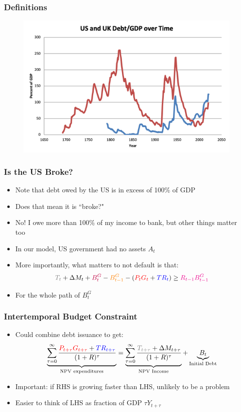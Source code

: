 \documentclass{beamer}
\begin{document}
\begin{frame}
\frametitle{Definitions}
\begin{figure}
\centering
\includegraphics[scale=0.6]{Debt2.png}
\end{figure}
\end{frame}

\begin{frame}
\frametitle{Is the US Broke?}
\begin{itemize}
\item Note that debt owed by the US is in excess of 100\% of GDP
\bigskip
\item Does that mean it is ``broke?"
\bigskip
\item<2-> No!  I owe more than 100\% of my income to bank, but other things matter too
\bigskip
\item<3-> In our model, US government had no assets $A_t$ 
\bigskip
\item<4-> More importantly, what matters to not default is that:
$$\textcolor{gray}{T_t}+\Delta M_t+\textcolor{purple}{B_t^G}-\textcolor{orange}{B_{t-1}^G}-(\textcolor{red}{P_tG_t}+\textcolor{blue}{TR_t})\geq\textcolor{magenta}{R_{t-1}B_{t-1}^G}$$
\item<5-> For the whole path of $B_t^G$
\end{itemize}
\end{frame}

\begin{frame}
\frametitle{Intertemporal Budget Constraint}
\begin{itemize}
\item Could combine debt issuance to get:
$$\underbrace{\sum_{\tau=0}^\infty\frac{\textcolor{red}{P_{t+\tau}G_{t+\tau}}+\textcolor{blue}{TR_{t+\tau}}}{(1+R)^\tau}}_{\text{NPV expenditures}}=\underbrace{\sum_{\tau=0}^\infty \frac{\textcolor{gray}{T_{t+\tau}}+\Delta M_{t+\tau}}{(1+R)^\tau}}_{\text{NPV Income}}+\underbrace{B_t}_{\text{Initial Debt}}$$
\bigskip
\item Important: if RHS is growing faster than LHS, unlikely to be a problem
\bigskip
\item Easier to think of LHS as fraction of GDP $\tau Y_{t+\tau}$
\end{itemize}
\end{frame}
\end{document}
